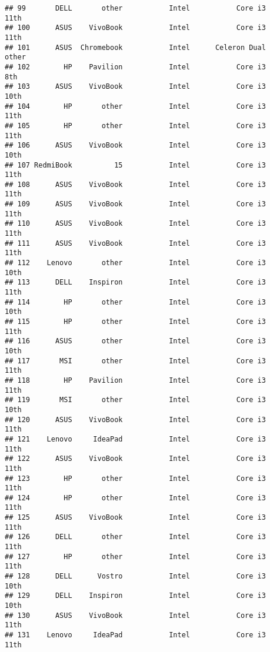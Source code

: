\documentclass[
]{article}
\begin{document}
\begin{verbatim}
## 99       DELL       other           Intel           Core i3            11th
## 100      ASUS    VivoBook           Intel           Core i3            11th
## 101      ASUS  Chromebook           Intel      Celeron Dual           other
## 102        HP    Pavilion           Intel           Core i3             8th
## 103      ASUS    VivoBook           Intel           Core i3            10th
## 104        HP       other           Intel           Core i3            11th
## 105        HP       other           Intel           Core i3            11th
## 106      ASUS    VivoBook           Intel           Core i3            10th
## 107 RedmiBook          15           Intel           Core i3            11th
## 108      ASUS    VivoBook           Intel           Core i3            11th
## 109      ASUS    VivoBook           Intel           Core i3            11th
## 110      ASUS    VivoBook           Intel           Core i3            11th
## 111      ASUS    VivoBook           Intel           Core i3            11th
## 112    Lenovo       other           Intel           Core i3            10th
## 113      DELL    Inspiron           Intel           Core i3            11th
## 114        HP       other           Intel           Core i3            10th
## 115        HP       other           Intel           Core i3            11th
## 116      ASUS       other           Intel           Core i3            10th
## 117       MSI       other           Intel           Core i3            11th
## 118        HP    Pavilion           Intel           Core i3            11th
## 119       MSI       other           Intel           Core i3            10th
## 120      ASUS    VivoBook           Intel           Core i3            11th
## 121    Lenovo     IdeaPad           Intel           Core i3            11th
## 122      ASUS    VivoBook           Intel           Core i3            11th
## 123        HP       other           Intel           Core i3            11th
## 124        HP       other           Intel           Core i3            11th
## 125      ASUS    VivoBook           Intel           Core i3            11th
## 126      DELL       other           Intel           Core i3            11th
## 127        HP       other           Intel           Core i3            11th
## 128      DELL      Vostro           Intel           Core i3            10th
## 129      DELL    Inspiron           Intel           Core i3            10th
## 130      ASUS    VivoBook           Intel           Core i3            11th
## 131    Lenovo     IdeaPad           Intel           Core i3            11th

\end{verbatim}
\end{document}

